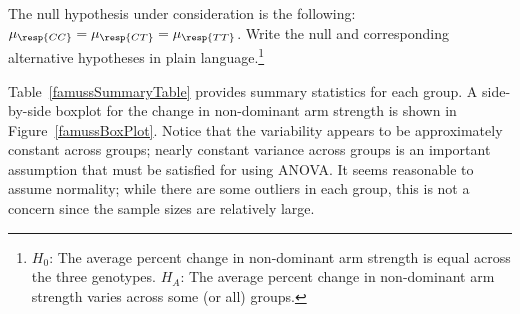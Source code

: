 \begin{exercise} \label{nullHypForFamuss}
	The null hypothesis under consideration is the following: $\mu_{\resp{CC}} = \mu_{\resp{CT}} = \mu_{\resp{TT}}$.
	Write the null and corresponding alternative hypotheses in plain language.\footnote{$H_0$: The average percent change in non-dominant arm strength is equal across the three genotypes. $H_A$: The average percent change in non-dominant arm strength varies across some (or all) groups.}
\end{exercise}

Table~\ref{famussSummaryTable} provides summary statistics for each group. A side-by-side boxplot for the change in non-dominant arm strength is shown in Figure~\ref{famussBoxPlot}. Notice that the variability appears to be approximately constant across groups; nearly constant variance across groups is an important assumption that must be satisfied for using ANOVA. It seems reasonable to assume normality; while there are some outliers in each group, this is not a concern since the sample sizes are relatively large.

